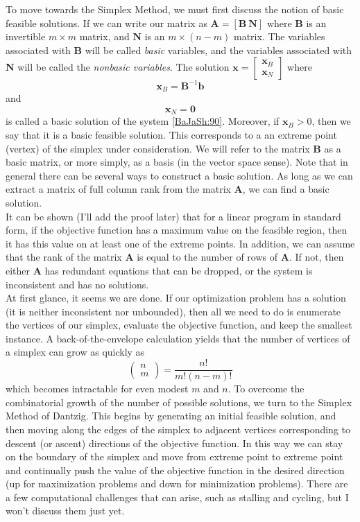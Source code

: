 \documentclass[12pt,english]{article}
\begin{document}
To move towards the Simplex Method, we must first discuss the notion of basic feasible solutions.   If we can write our matrix as $\mathbf{A} = [\mathbf{B}~ \mathbf{N}]$ where $\mathbf{B}$ is an invertible $m \times m$ matrix, and $\mathbf{N}$ is an $m \times (n-m)$ matrix.  The variables associated with $\mathbf{B}$ will be called {\it basic} variables, and the variables associated with $\mathbf{N}$ will be called the {\it nonbasic variables}. The solution $\mathbf{x} = \left[\begin{array}{c} \mathbf{x}_B \\ \mathbf{x}_N \end{array}\right]$ where 
$$
\mathbf{x}_B = \mathbf{B}^{-1} \mathbf{b}
$$
and
$$
\mathbf{x}_N = \mathbf{0}
$$
is called a basic solution of the system \ref{BaJaSh:90}.  Moreover, if $\mathbf{x}_B >0$, then we say that it is a basic feasible solution.  This corresponds to a an extreme point (vertex) of the simplex under consideration.  We will refer to the matrix $\mathbf{B}$ as a basic matrix, or more simply, as a basis (in the vector space sense).  Note that in general there can be several ways to construct a basic solution.  As long as we can extract a matrix of full column rank from the matrix $\mathbf{A}$, we can find a basic solution.   \\


It can be shown (I'll add the proof later) that for a linear program in standard form, if the objective function has a maximum value on the feasible region, then it has this value on at least one of the extreme points.   In addition, we can assume that the rank of the matrix $\mathbf{A}$ is equal to the number of rows of $\mathbf{A}$.  If not, then either $\mathbf{A}$ has redundant equations that can be dropped, or the system is inconsistent and has no solutions.\\

At first glance, it seems we are done.  If our optimization problem has a solution (it is neither inconsistent nor unbounded), then all we need to do is enumerate the vertices of our simplex, evaluate the objective function, and keep the smallest instance.  A back-of-the-envelope calculation yields that the number of vertices of a simplex can grow as quickly as
$$
\left(
\begin{array}{c}
n\\
m
\end{array}
\right)
= 
\frac{n!}{m!(n-m)!}
$$
which becomes intractable for even modest $m$ and $n$.  To overcome the combinatorial growth of the number of possible solutions, we turn to the Simplex Method of Dantzig.   This begins by generating an initial feasible solution, and then moving along the edges of the simplex to adjacent vertices corresponding to descent (or ascent) directions of the objective function.  In this way we can stay on the boundary of the simplex and move from extreme point to extreme point and continually push the value of the objective function in the desired direction (up for maximization problems and down for minimization problems).  There are a few computational challenges that can arise, such as stalling and cycling, but I won't discuss them just yet.\\
\end{document}
